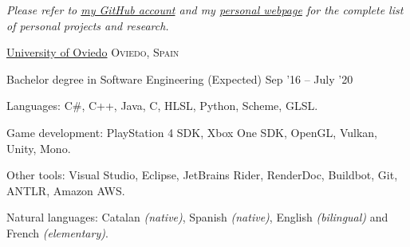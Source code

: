 \documentclass[10pt,a4paper]{article} %
\begin{document}

\begin{center}
\textit{Please refer to \href{https://github.com/pacojq}{my GitHub account} and my \href{http://pacojq.github.io}{personal webpage} for the complete list of personal projects and research.}
\end{center}


\spacedhrule{-0.2em}{-0.4em} %




\headedsection %
{\href{http://www.uniovi.es/en/inicio}{University of Oviedo}}
{\textsc{Oviedo, Spain}} {

\headedsubsection %
{Bachelor degree in Software Engineering}
{(Expected) Sep '16 -- July '20}
{}

}

\spacedhrule{0.5em}{-0.4em} %



\inlineheadsection %
{Languages:}
{C\#, C++, Java, C, HLSL, Python, Scheme, GLSL.}


\inlineheadsection %
{Game development:}
{PlayStation 4 SDK, Xbox One SDK, OpenGL, Vulkan, Unity, Mono.}


\inlineheadsection %
{Other tools:}
{Visual Studio, Eclipse, JetBrains Rider, RenderDoc, Buildbot, Git, ANTLR, Amazon AWS.}


\inlineheadsection %
{Natural languages:}
{Catalan \textit{(native)}, Spanish \textit{(native)}, English \textit{(bilingual)} and French \textit{(elementary)}.}

\end{document}

